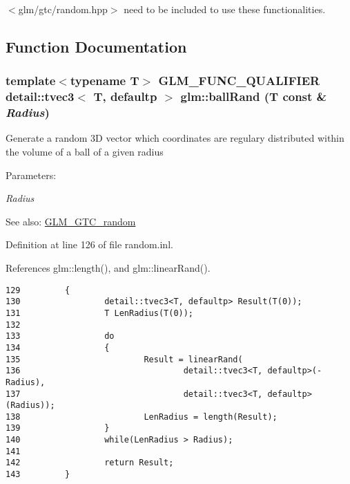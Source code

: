 $<$glm/gtc/random.hpp$>$ need to be included to use these functionalities. 

\subsection{Function Documentation}
\hypertarget{group__gtc__random_g8543dd05af529c33cb10deb832aab03a}{
\subsubsection[ballRand]{\setlength{\rightskip}{0pt plus 5cm}template$<$typename T$>$ GLM\_\-FUNC\_\-QUALIFIER detail::tvec3$<$ T, defaultp $>$ glm::ballRand (T const \& {\em Radius})}}
\label{group__gtc__random_g8543dd05af529c33cb10deb832aab03a}


Generate a random 3D vector which coordinates are regulary distributed within the volume of a ball of a given radius

\begin{Desc}
\item[Parameters:]
\begin{description}
\item[{\em Radius}]\end{description}
\end{Desc}
\begin{Desc}
\item[See also:]\hyperlink{group__gtc__random}{GLM\_\-GTC\_\-random} \end{Desc}


Definition at line 126 of file random.inl.

References glm::length(), and glm::linearRand().

\begin{Code}\begin{verbatim}129         {               
130                 detail::tvec3<T, defaultp> Result(T(0));
131                 T LenRadius(T(0));
132                 
133                 do
134                 {
135                         Result = linearRand(
136                                 detail::tvec3<T, defaultp>(-Radius),
137                                 detail::tvec3<T, defaultp>(Radius));
138                         LenRadius = length(Result);
139                 }
140                 while(LenRadius > Radius);
141                 
142                 return Result;
143         }
\end{verbatim}
\end{Code}




